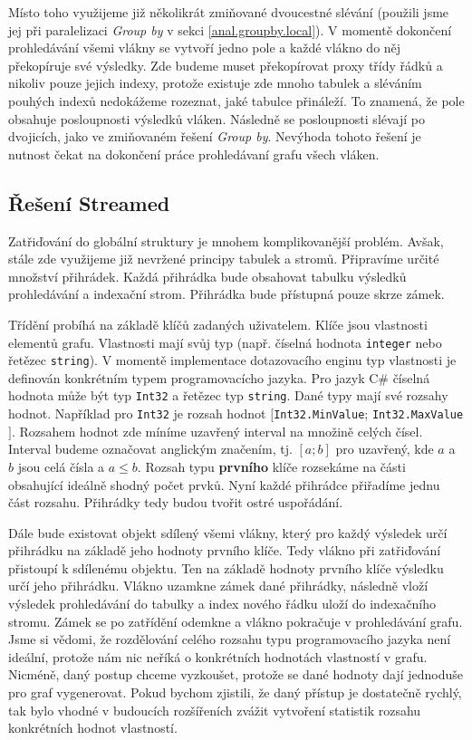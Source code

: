 Místo toho využijeme již několikrát zmiňované dvoucestné slévání (použili jsme jej při paralelizaci \textit{Group by} v sekci \ref{anal.groupby.local}).
V momentě dokončení prohledávání všemi vlákny se vytvoří jedno pole a každé vlákno do něj překopíruje své výsledky.
Zde budeme muset překopírovat proxy třídy řádků a nikoliv pouze jejich indexy, protože existuje zde mnoho tabulek a sléváním pouhých indexů nedokážeme rozeznat, jaké tabulce přináleží.
To znamená, že pole obsahuje posloupnosti výsledků vláken.
Následně se posloupnosti slévají po dvojicích, jako ve zmiňovaném řešení \textit{Group by}. 
Nevýhoda tohoto řešení je nutnost čekat na dokončení práce prohledávaní grafu všech vláken.
 
\subsection{Řešení Streamed} \label{anal.improvement.orderby.streamed}

Zatřiďování do globální struktury je mnohem komplikovanější problém.
Avšak, stále zde využijeme již nevržené principy tabulek a stromů.
Připravíme určité množství přihrádek.
Každá přihrádka bude obsahovat tabulku výsledků prohledávání a indexační strom.
Přihrádka bude přístupná pouze skrze zámek.

Třídění probíhá na základě klíčů zadaných uživatelem.
Klíče jsou vlastnosti elementů grafu.
Vlastnosti mají svůj typ (např. číselná hodnota \texttt{integer} nebo řetězec \texttt{string}).
V momentě implementace dotazovacího enginu typ vlastnosti je definován konkrétním typem programovacícho jazyka.
Pro jazyk C\# číselná hodnota může být typ \texttt{Int32} a řetězec typ \texttt{string}.
Dané typy mají své rozsahy hodnot.
Například pro \texttt{Int32} je rozsah hodnot $[$\texttt{Int32.MinValue}; \texttt{Int32.MaxValue}$]$.
Rozsahem hodnot zde míníme uzavřený interval na množině celých čísel.
Interval budeme označovat anglickým značením, tj. $[a; b]$ pro uzavřený, kde $a$ a $b$ jsou celá čísla a $a\leq b$.
Rozsah typu \textbf{prvního} klíče rozsekáme na části obsahující ideálně shodný počet prvků. 
Nyní každé přihrádce přiřadíme jednu část rozsahu. 
Přihrádky tedy budou tvořit ostré uspořádání.

Dále bude existovat objekt sdílený všemi vlákny, který pro každý výsledek určí přihrádku na základě jeho hodnoty prvního klíče.
Tedy vlákno při zatřiďování přistoupí k sdílenému objektu.
Ten na základě hodnoty prvního klíče výsledku určí jeho přihrádku.
Vlákno uzamkne zámek dané přihrádky, následně vloží výsledek prohledávání do tabulky a index nového řádku uloží do indexačního stromu.
Zámek se po zatřídění odemkne a vlákno pokračuje v prohledávání grafu.
Jsme si vědomi, že rozdělování celého rozsahu typu programovacího jazyka není ideální, protože nám nic neříká o konkrétních hodnotách vlastností v grafu.
Nicméně, daný postup chceme vyzkoušet, protože se dané hodnoty dají jednoduše pro graf vygenerovat.
Pokud bychom zjistili, že daný přístup je dostatečně rychlý, tak bylo vhodné v budoucích rozšířeních zvážit vytvoření statistik rozsahu konkrétních hodnot vlastností.

